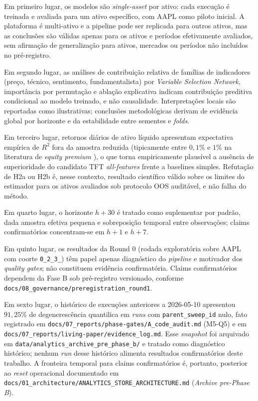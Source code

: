 Em primeiro lugar, os modelos são \textit{single-asset} por ativo: cada execução é treinada e avaliada para um ativo específico, com AAPL como piloto inicial. A plataforma é multi-ativo e a pipeline pode ser replicada para outros ativos, mas as conclusões são válidas apenas para os ativos e períodos efetivamente avaliados, sem afirmação de generalização para ativos, mercados ou períodos não incluídos no pré-registro.

Em segundo lugar, as análises de contribuição relativa de famílias de indicadores (preço, técnico, sentimento, fundamentalista) por \textit{Variable Selection Network}, importância por permutação e ablação explicativa indicam contribuição preditiva condicional ao modelo treinado, e não causalidade. Interpretações locais são reportadas como ilustrativas; conclusões metodológicas derivam de evidência global por horizonte e da estabilidade entre sementes e \textit{folds}.

Em terceiro lugar, retornos diários de ativo líquido apresentam expectativa empírica de \(R^2\) fora da amostra reduzida (tipicamente entre \(0{,}1\%\) e \(1\%\) na literatura de \textit{equity premium} \cite{GU2020}), o que torna empiricamente plausível a ausência de superioridade do candidato TFT \textit{all-features} frente a baselines simples. Refutação de H2a ou H2b é, nesse contexto, resultado científico válido sobre os limites do estimador para os ativos avaliados sob protocolo OOS auditável, e não falha do método.

Em quarto lugar, o horizonte \(h+30\) é tratado como suplementar por padrão, dada amostra efetiva pequena e sobreposição temporal entre observações; claims confirmatórios concentram-se em \(h+1\) e \(h+7\).

Em quinto lugar, os resultados da Round 0 (rodada exploratória sobre AAPL com coorte \texttt{0\_2\_3\_}) têm papel apenas diagnóstico do \textit{pipeline} e motivador dos \textit{quality gates}; não constituem evidência confirmatória. Claims confirmatórios dependem da Fase B sob pré-registro versionado, conforme \texttt{docs/08\_governance/preregistration\_round1}.

Em sexto lugar, o histórico de execuções anteriores a 2026-05-10 apresentou \(91{,}25\%\) de degenerescência quantilica em \textit{runs} com \texttt{parent\_sweep\_id} nulo, fato registrado em \texttt{docs/07\_reports/phase-gates/A\_code\_audit.md} (M5-Q5) e em \texttt{docs/07\_reports/living-paper/evidence\_log.md}. Esse \textit{snapshot} foi arquivado em \texttt{data/analytics\_archive\_pre\_phase\_b/} e tratado como diagnóstico histórico; nenhum \textit{run} desse histórico alimenta resultados confirmatórios deste trabalho. A fronteira temporal para claims confirmatórios é, portanto, posterior ao \textit{reset} operacional documentado em \texttt{docs/01\_architecture/ANALYTICS\_STORE\_ARCHITECTURE.md} (\textit{Archive pre-Phase B}).

